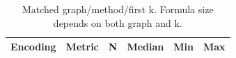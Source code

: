 \begin{table}[htbp]
\centering
\caption{Matched graph/method/first k. Formula size depends on both graph and k.}
\label{tab:p1-Repeated-formula-sizes}
\begin{tabular}{llllll}
\hline
Encoding & Metric & N & Median & Min & Max \\
\hline
\hline
\end{tabular}
\end{table}

